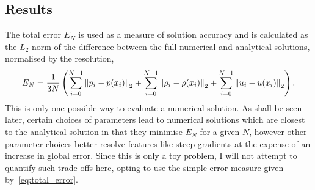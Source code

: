\subsection{Results}

The total error $E_N$ is used as a measure of solution accuracy and is calculated as the $L_2$ norm of the difference between the full numerical and analytical solutions, normalised by the resolution,
\begin{equation}
  \label{eq:total_error}
E_N = \frac{1}{3N} \left(
\sum_{i=0}^{N-1} \left\lVert p_i - p(x_i)\right\rVert_2
+ \sum_{i=0}^{N-1} \left\lVert\rho_i - \rho(x_i)\right\rVert_2
+ \sum_{i=0}^{N-1} \left\lVert u_i - u(x_i)\right\rVert_2 \right).
\end{equation}
This is only one possible way to evaluate a numerical solution. As shall be seen later, certain choices of parameters lead to numerical solutions which are closest to the analytical solution in that they minimise $E_N$ for a given $N$, however other parameter choices better resolve features like steep gradients at the expense of an increase in global error. Since this is only a toy problem, I will not attempt to quantify such trade-offs here, opting to use the simple error measure given by~\eqref{eq:total_error}.

